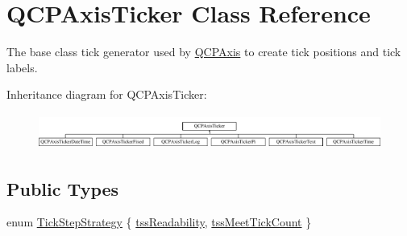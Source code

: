 \hypertarget{class_q_c_p_axis_ticker}{}\section{Q\+C\+P\+Axis\+Ticker Class Reference}
\label{class_q_c_p_axis_ticker}


The base class tick generator used by \mbox{\hyperlink{class_q_c_p_axis}{Q\+C\+P\+Axis}} to create tick positions and tick labels.  


Inheritance diagram for Q\+C\+P\+Axis\+Ticker\+:\begin{figure}[H]
\begin{center}
\leavevmode
\includegraphics[height=1.181435cm]{class_q_c_p_axis_ticker}
\end{center}
\end{figure}
\subsection*{Public Types}
\begin{DoxyCompactItemize}
\item 
enum \mbox{\hyperlink{class_q_c_p_axis_ticker_ab6d2f9d9477821623ac9bc4b21ddf49a}{Tick\+Step\+Strategy}} \{ \mbox{\hyperlink{class_q_c_p_axis_ticker_ab6d2f9d9477821623ac9bc4b21ddf49aa9002aa2fd5633ab5556c71a26fed63a8}{tss\+Readability}}, 
\mbox{\hyperlink{class_q_c_p_axis_ticker_ab6d2f9d9477821623ac9bc4b21ddf49aa770312b6b9b0c64a37ceeba96e0cd7f2}{tss\+Meet\+Tick\+Count}}
 \}
\end{DoxyCompactItemize}
